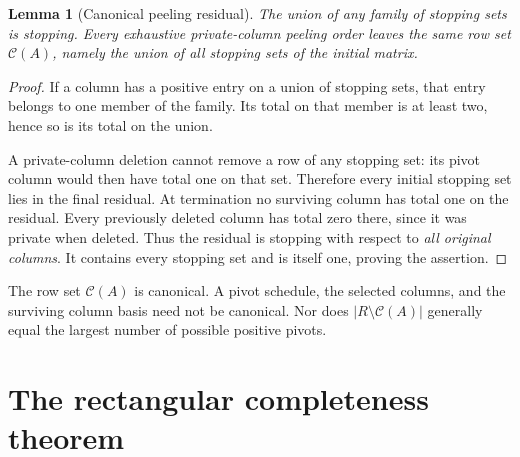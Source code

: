 \documentclass[11pt]{article}
\newtheorem{lemma}[theorem]{Lemma}
\theoremstyle{definition}\newtheorem{definition}[theorem]{Definition}
\theoremstyle{remark}\newtheorem{remark}[theorem]{Remark}
\newcommand{\core}{\mathcal C}
\begin{document}
\begin{lemma}[Canonical peeling residual]
\label{lem:canonical}
The union of any family of stopping sets is stopping. Every exhaustive private-column peeling order leaves the same row set $\core(A)$, namely the union of all stopping sets of the initial matrix.
\end{lemma}
\begin{proof}
If a column has a positive entry on a union of stopping sets, that entry belongs to one member of the family. Its total on that member is at least two, hence so is its total on the union.

A private-column deletion cannot remove a row of any stopping set: its pivot column would then have total one on that set. Therefore every initial stopping set lies in the final residual. At termination no surviving column has total one on the residual. Every previously deleted column has total zero there, since it was private when deleted. Thus the residual is stopping with respect to \emph{all original columns}. It contains every stopping set and is itself one, proving the assertion.
\end{proof}

The row set $\core(A)$ is canonical. A pivot schedule, the selected columns, and the surviving column basis need not be canonical. Nor does $|R\setminus\core(A)|$ generally equal the largest number of possible positive pivots.

\section{The rectangular completeness theorem}
\label{sec:complete}
\end{document}

